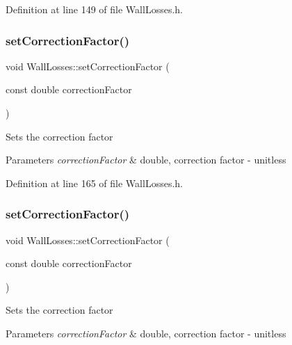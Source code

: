 Definition at line 149 of file Wall\+Losses.\+h.

\mbox{\label{class_wall_losses_affdf3f6c3d54d73c7f91e1515fb12533}} 
\subsubsection{\texorpdfstring{set\+Correction\+Factor()}{setCorrectionFactor()}\hspace{0.1cm}{\footnotesize\ttfamily [1/3]}}
{\footnotesize\ttfamily void Wall\+Losses\+::set\+Correction\+Factor (\begin{DoxyParamCaption}\item[{const double}]{correction\+Factor }\end{DoxyParamCaption})\hspace{0.3cm}{\ttfamily [inline]}}

Sets the correction factor 
\begin{DoxyParams}{Parameters}
{\em correction\+Factor} & double, correction factor -\/ unitless \\
\hline
\end{DoxyParams}


Definition at line 165 of file Wall\+Losses.\+h.

\mbox{\label{class_wall_losses_affdf3f6c3d54d73c7f91e1515fb12533}} 
\subsubsection{\texorpdfstring{set\+Correction\+Factor()}{setCorrectionFactor()}\hspace{0.1cm}{\footnotesize\ttfamily [2/3]}}
{\footnotesize\ttfamily void Wall\+Losses\+::set\+Correction\+Factor (\begin{DoxyParamCaption}\item[{const double}]{correction\+Factor }\end{DoxyParamCaption})\hspace{0.3cm}{\ttfamily [inline]}}

Sets the correction factor 
\begin{DoxyParams}{Parameters}
{\em correction\+Factor} & double, correction factor -\/ unitless \\
\hline
\end{DoxyParams}


